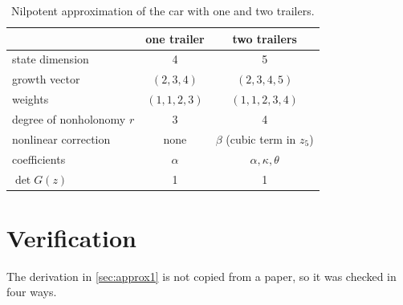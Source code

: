 \begin{table}[t]
  \centering
  \caption{Nilpotent approximation of the car with one and two trailers.}
  \label{tab:approx}
  \begin{tabular}{lcc}
    \toprule
                                   & one trailer & two trailers \\
    \midrule
    state dimension                & 4           & 5 \\
    growth vector                  & $(2,3,4)$   & $(2,3,4,5)$ \\
    weights                        & $(1,1,2,3)$ & $(1,1,2,3,4)$ \\
    degree of nonholonomy $r$      & 3           & 4 \\
    nonlinear correction           & none        & $\beta$ (cubic term in $z_5$) \\
    coefficients                   & $\alpha$    & $\alpha,\kappa,\theta$ \\
    $\det G(z)$                    & 1           & 1 \\
    \bottomrule
  \end{tabular}
\end{table}

\section{Verification}
\label{sec:verification}

The derivation in \cref{sec:approx1} is not copied from a paper, so it was
checked in four ways.

